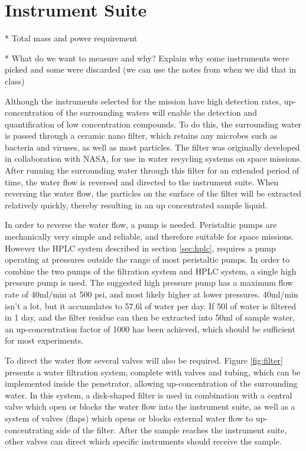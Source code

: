 \chapter{Instrument Suite}

* Total mass and power requirement

* What do we want to measure and why? Explain why some instruments were picked and some were discarded (we can use the notes from when we did that in class)


\label{sec:water_flow}
Although the instruments selected for the mission have high detection rates, up-concentration of the surrounding waters will enable the detection and quantification of low concentration compounds. To do this, the surrounding water is passed through a ceramic nano filter, which retains any microbes such as bacteria and viruses, as well as most particles. The filter was originally developed in collaboration with NASA, for use in water recycling systems on space missions. After running the surrounding water through this filter for an extended period of time, the water flow is reversed and directed to the instrument suite. When reversing the water flow, the particles on the surface of the filter will be extracted relatively quickly, thereby resulting in an up concentrated sample liquid.

In order to reverse the water flow, a pump is needed. Peristaltic pumps are mechanically very simple and reliable, and therefore suitable for space missions. However the HPLC system described in section \ref{sec:hplc}, requires a pump operating at pressures outside the range of most peristaltic pumps. In order to combine the two pumps of the filtration system and HPLC system, a single high pressure pump \cite{hplc_motor} is used. The suggested high pressure pump has a maximum flow rate of 40ml/min at 500 psi, and most likely higher at lower pressures. 40ml/min isn't a lot, but it accumulates to 57,6l of water per day. If 50l of water is filtered in 1 day, and the filter residue can then be extracted into 50ml of sample water, an up-concentration factor of 1000 has been achieved, which should be sufficient for most experiments.

To direct the water flow several valves will also be required. Figure \ref{fig:filter} presents a water filtration system, complete with valves and tubing, which can be implemented inside the penetrator, allowing up-concentration of the surrounding water. In this system, a disk-shaped filter is used in combination with a central valve which open or blocks the water flow into the instrument suite, as well as a system of valves (flaps) which opens or blocks external water flow to up-concentrating side of the filter. After the sample reaches the instrument suite, other valves can direct which specific instruments should receive the sample.

